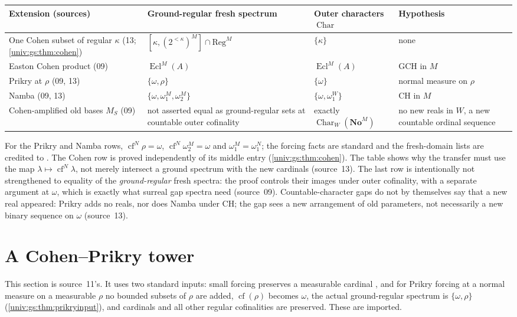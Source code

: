 \documentclass[11pt,letterpaper]{article}
\numberwithin{equation}{section}
\theoremstyle{definition}
\theoremstyle{remark}
\newcommand{\No}{\mathbf{No}}
\newcommand{\NoM}{\No^{M}}
\newcommand{\cf}{\operatorname{cf}}
\newcommand{\Char}{\operatorname{Char}}
\newcommand{\Reg}{\mathrm{Reg}}
\newcommand{\Ecl}{\operatorname{Ecl}}
\begin{document}
\begin{center}\small
\begin{longtable}{@{}P{0.25\textwidth}P{0.25\textwidth}P{0.19\textwidth}P{0.22\textwidth}@{}}
\toprule
Extension (sources) & Ground-regular fresh spectrum & Outer characters $\Char$ & Hypothesis\\
\midrule
\endhead
One Cohen subset of regular $\kappa$ (13; \cref{univ:gs:thm:cohen}) & $[\kappa,(2^{<\kappa})^M]\cap\Reg^M$ \cite[Proposition~6.1]{FKW} & $\{\kappa\}$ & none\\[3pt]
Easton Cohen product (09) & $\Ecl^M(A)$ & $\Ecl^M(A)$ & GCH in $M$\\[3pt]
Prikry at $\rho$ (09, 13) & $\{\omega,\rho\}$ & $\{\omega\}$ & normal measure on $\rho$\\[3pt]
Namba (09, 13) & $\{\omega,\omega_1^M,\omega_2^M\}$ & $\{\omega,\omega_1^W\}$ & CH in $M$\\[3pt]
Cohen-amplified old bases $M_S$ (09) & not asserted equal as ground-regular sets at countable outer cofinality & exactly $\Char_W(\NoM)$ & no new reals in $W$, a new countable ordinal sequence\\
\bottomrule
\end{longtable}
\end{center}

For the Prikry and Namba rows, $\cf^N\rho=\omega$, $\cf^N\omega_2^M=\omega$ and
$\omega_1^M=\omega_1^N$; the forcing facts are standard \cite{Jech} and the fresh-domain lists are
credited to \cite{FKW}. The Cohen row is proved independently of its middle entry
(\cref{univ:gs:thm:cohen}). The table shows why the transfer must use the map
$\lambda\mapsto\cf^N\lambda$, not merely intersect a ground spectrum with the new cardinals
(source~13). The last row is intentionally not strengthened to equality of the
\emph{ground-regular} fresh spectra: the proof controls their images under outer cofinality, with
a separate argument at $\omega$, which is exactly what surreal gap spectra need (source~09).
Countable-character gaps do not by themselves say that a new real appeared: Prikry adds no reals,
nor does Namba under CH; the gap sees a new arrangement of old parameters, not necessarily a new
binary sequence on $\omega$ (source~13).

\section{A Cohen--Prikry tower}\label{univ:gs:sec:tower}

This section is source~11's. It uses two standard inputs: small forcing preserves a measurable
cardinal \cite{LevySolovay}, and for Prikry forcing at a normal measure on a measurable $\rho$ no
bounded subsets of $\rho$ are added, $\cf(\rho)$ becomes $\omega$, the actual ground-regular
spectrum is $\{\omega,\rho\}$ (\cref{univ:gs:thm:prikryinput}), and cardinals and all other
regular cofinalities are preserved. These are imported.
\end{document}
